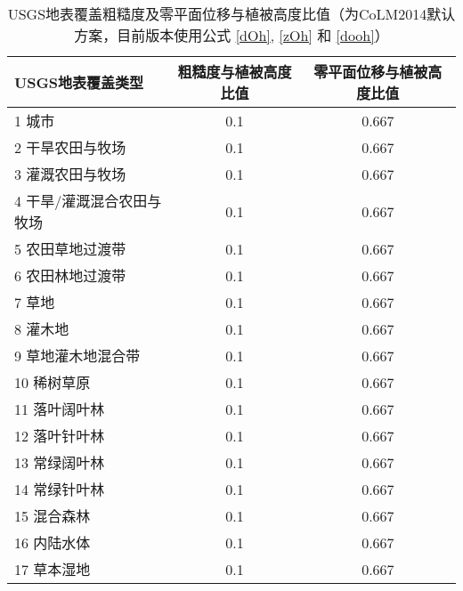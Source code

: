 \begin{table}[htbp]
  \centering
  \caption[USGS地表覆盖粗糙度及零平面位移与植被高度比值]{USGS地表覆盖粗糙度及零平面位移与植被高度比值（为CoLM2014默认方案，目前版本使用公式 \eqref{dOh}, \eqref{zOh} 和 \eqref{dooh}）}
  \label{tab:USGS地表覆盖粗糙度及零平面位移与植被高度比值}
  \begin{tabular}{@{}lcc@{}}
    \toprule
    USGS地表覆盖类型          & 粗糙度与植被高度比值 & 零平面位移与植被高度比值 \\ \midrule
    1 城市                    & 0.1                  & 0.667                    \\
    2 干旱农田与牧场          & 0.1                  & 0.667                    \\
    3 灌溉农田与牧场          & 0.1                  & 0.667                    \\
    4 干旱/灌溉混合农田与牧场 & 0.1                  & 0.667                    \\
    5 农田草地过渡带          & 0.1                  & 0.667                    \\
    6 农田林地过渡带          & 0.1                  & 0.667                    \\
    7 草地                    & 0.1                  & 0.667                    \\
    8 灌木地                  & 0.1                  & 0.667                    \\
    9 草地灌木地混合带        & 0.1                  & 0.667                    \\
    10 稀树草原               & 0.1                  & 0.667                    \\
    11 落叶阔叶林             & 0.1                  & 0.667                    \\
    12 落叶针叶林             & 0.1                  & 0.667                    \\
    13 常绿阔叶林             & 0.1                  & 0.667                    \\
    14 常绿针叶林             & 0.1                  & 0.667                    \\
    15 混合森林               & 0.1                  & 0.667                    \\
    16 内陆水体               & 0.1                  & 0.667                    \\
    17 草本湿地               & 0.1                  & 0.667                    \\

\end{tabular}
\end{table}
